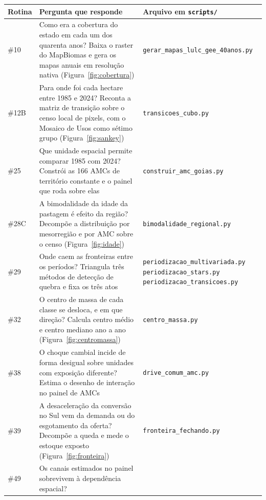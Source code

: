\begin{quadro}[!ht]
\centering
\caption[Rotinas citadas no texto]{Rotinas citadas nominalmente no texto, com a pergunta que cada uma responde.}
\label{quadro:rotinas}
\footnotesize
\begin{tabular}{p{1.3cm}p{6.1cm}p{5.8cm}}
\toprule
\textbf{Rotina} & \textbf{Pergunta que responde} & \textbf{Arquivo em \texttt{scripts/}} \\
\midrule
\#10 & Como era a cobertura do estado em cada um dos quarenta anos? Baixa o
raster do MapBiomas e gera os mapas anuais em resolução nativa
(Figura~\ref{fig:cobertura}) &
\texttt{gerar\_mapas\_lulc\_gee\_40anos.py} \\
\addlinespace
\#12B & Para onde foi cada hectare entre 1985 e 2024? Reconta a matriz de
transição sobre o censo local de pixels, com o Mosaico de Usos como sétimo
grupo (Figura~\ref{fig:sankey}) &
\texttt{transicoes\_cubo.py} \\
\addlinespace
\#25 & Que unidade espacial permite comparar 1985 com 2024? Constrói as 166
AMCs de território constante e o painel que roda sobre elas &
\texttt{construir\_amc\_goias.py} \\
\addlinespace
\#28C & A bimodalidade da idade da pastagem é efeito da região? Decompõe a
distribuição por mesorregião e por AMC sobre o censo
(Figura~\ref{fig:idade}) &
\texttt{bimodalidade\_regional.py} \\
\addlinespace
\#29 & Onde caem as fronteiras entre os períodos? Triangula três métodos de
detecção de quebra e fixa os três atos &
\texttt{periodizacao\_multivariada.py}
\newline \texttt{periodizacao\_stars.py}
\newline \texttt{periodizacao\_transicoes.py} \\
\addlinespace
\#32 & O centro de massa de cada classe se desloca, e em que direção?
Calcula centro médio e centro mediano ano a ano
(Figura~\ref{fig:centromassa}) &
\texttt{centro\_massa.py} \\
\addlinespace
\#38 & O choque cambial incide de forma desigual sobre unidades com exposição
diferente? Estima o desenho de interação no painel de AMCs &
\texttt{drive\_comum\_amc.py} \\
\addlinespace
\#39 & A desaceleração da conversão no Sul vem da demanda ou do esgotamento
da oferta? Decompõe a queda e mede o estoque exposto
(Figura~\ref{fig:fronteira}) &
\texttt{fronteira\_fechando.py} \\
\addlinespace
\#49 & Os canais estimados no painel sobrevivem à dependência espacial?

\end{tabular}
\end{quadro}
